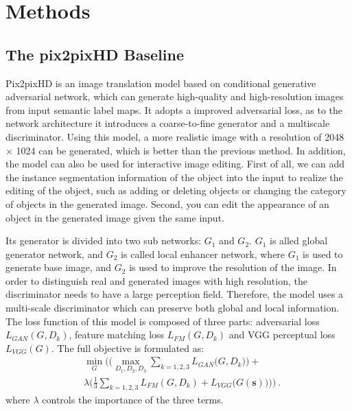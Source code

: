 \documentclass[10pt,twocolumn,letterpaper]{article}
\begin{document}
\section{Methods}

\subsection{The pix2pixHD Baseline}
Pix2pixHD\cite{pix2pixhd} is an image translation model based on conditional generative adversarial network, which can generate high-quality and high-resolution images from input semantic label maps. It adopts a improved adversarial loss, as to the network architecture it introduces a coarse-to-fine generator and a multiscale discriminator. Using this model, a more realistic image with a resolution of 2048 × 1024 can be generated, which is better than the previous method. In addition, the model can also be used for interactive image editing. First of all, we can add the instance segmentation information of the object into the input to realize the editing of the object, such as adding or deleting objects or changing the category of objects in the generated image. Second, you can edit the appearance of an object in the generated image given the same input. 

Its generator is divided into two sub networks: $G_1$ and $G_2$. $G_1$ is alled global generator network, and $G_2$ is called local enhancer network, where $G_1$ is used to generate base image, and $G_2$ is used to improve the resolution of the image. In order to distinguish real and generated images with high resolution, the discriminator needs to have a large perception field. Therefore, the model uses a multi-scale discriminator which can preserve both global and local information. The loss function of this model is composed of three parts: adversarial loss $L_{GAN}(G,D_k)$, feature matching loss $L_{FM}(G,D_k)$ and VGG perceptual loss $L_{VGG}(G)$. The full objective is formulated as:
\begin{equation}
\begin{split}
	&\underset{G}{\min}\Bigg(\bigg(\underset{D_1,D_2,D_3}{\max} \sum_{k=1,2,3}{L_{GAN}\big(G,D_k\big)}\bigg)+  \\
	&\lambda \bigg(\frac{1}{3}\sum_{k=1,2,3}{L_{FM}(G,D_k)}+L_{VGG}{\big(G(\boldsymbol{s})\big)}\bigg)\Bigg)~.
\end{split}
\end{equation}
\noindent
where $\lambda$ controls the importance of the three terms.
\end{document}
